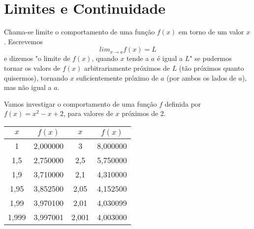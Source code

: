 \chapter{Limites e Continuidade}

Chama-se limite o comportamento de uma função $f(x)$ em torno de um valor $x$. Escrevemos
$$lim_{x \rightarrow a} f(x) = L$$
e dizemos "o limite de $f(x)$, quando $x$ tende a $a$ é igual a $L$" se pudermos tornar os valors de $f(x)$ arbitrariamente próximos de $L$ (tão próximos quanto quisermos), tornando $x$ suficientemente próximo de $a$ (por ambos os lados de $a$), mas não igual a $a$.

\begin{example}
Vamos investigar o comportamento de uma função $f$ definida por $f(x) = x^2 - x + 2$, para valores de $x$ próximos de 2.


\begin{table}
\begin{tabular}{|c|c||c|c|}
\hline
$x$ & $f(x)$ & $x$ & $f(x)$ \\
\hline 
1 & 2,000000 & 3 & 8,000000 \\
\hline
1,5 & 2,750000 & 2,5 & 5,750000 \\
\hline
1,9 & 3,710000 & 2,1 & 4,310000 \\
\hline
1,95 & 3,852500 & 2,05 & 4,152500 \\
\hline
1,99 & 3,970100 & 2,01 & 4,030099 \\
\hline
1,999 & 3,997001 & 2,001 & 4,003000 \\
\hline
\end{tabular}
\end{table}

\end{example}

